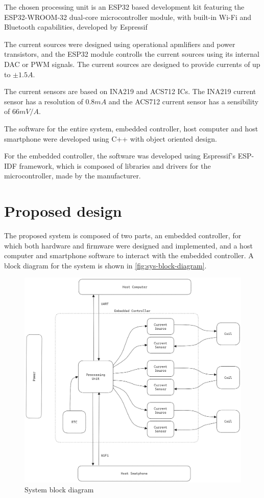 \documentclass[10pt,twocolumn,letterpaper]{article}
\begin{document}
The chosen processing unit is an ESP32 based development kit featuring the ESP32-WROOM-32\cite{esp32} dual-core microcontroller module, with built-in Wi-Fi and Bluetooth capabilities, developed by Espressif \cite{espressif}

The current sources were designed using operational apmlifiers and power transistors, and the ESP32 module controlls the current sources using its internal DAC or PWM signals.
The current sources are designed to provide currents of up to \( \pm 1.5 A \).

The current sensors are based on INA219 \cite{ina219} and ACS712 \cite{acs712} ICs. The INA219 current sensor has a resolution of $0.8 mA$ and the ACS712 current sensor has a sensibility of $66 mV/A$.

The software for the entire system, embedded controller, host computer and host smartphone were developed using C++ with object oriented design.

For the embedded controller, the software was developed using Espressif's ESP-IDF \cite{espidf} framework, which is composed of libraries and drivers for the microcontroller, made by the manufacturer.

\section{Proposed design}

The proposed system is composed of two parts, an embedded controller, for which both hardware and firmware were designed and implemented, and a host computer and smartphone software to interact with the embedded controller. A block diagram for the system is shown in \autoref{fig:sys-block-diagram}.

\begin{figure}[htb]
  \centering
  \includegraphics[width=\linewidth, keepaspectratio]{figures/block-diagram.png}
  \caption{System block diagram}
  \label{fig:sys-block-diagram}
\end{figure}
\end{document}
